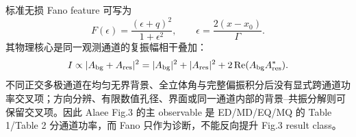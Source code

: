 标准无损 Fano feature 可写为\cite{Miroshnichenko2010}
\begin{equation}
F(\epsilon)=\frac{(\epsilon+q)^2}{1+\epsilon^2},\qquad
\epsilon=\frac{2(x-x_0)}{\Gamma}.
\label{eq:fano}
\end{equation}
其物理核心是同一观测通道的复振幅相干叠加：
\begin{equation}
I\propto|A_{\rm bg}+A_{\rm res}|^2
=|A_{\rm bg}|^2+|A_{\rm res}|^2+2\operatorname{Re}(A_{\rm bg}A_{\rm res}^*).
\end{equation}
不同正交多极通道在均匀无界背景、全立体角与完整偏振积分后没有显式跨通道功率交叉项；方向分辨、有限数值孔径、界面或同一通道内部的背景--共振分解则可保留交叉项\cite{Tribelsky2016,Fu2013}。因此 Alaee Fig.3 的主 observable 是 ED/MD/EQ/MQ 的 Table 1/Table 2 分通道功率，而 Fano 只作为诊断，不能反向提升 Fig.3 result class。

